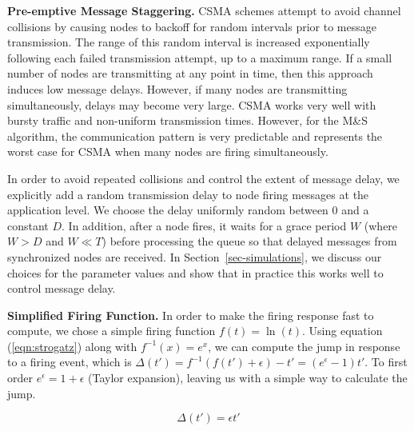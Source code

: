 {%




{\bf Pre-emptive Message Staggering.} CSMA schemes attempt to avoid
channel collisions by causing nodes to backoff for random intervals
prior to message transmission. The range of this random interval is
increased exponentially following each failed transmission attempt, up
to a maximum range.  If a small number of nodes are transmitting at
any point in time, then this approach induces low message delays.
However, if many nodes are transmitting simultaneously, delays may
become very large. CSMA works very well with bursty traffic and
non-uniform transmission times.  However, for the M\&S algorithm, the
communication pattern is very predictable and represents the worst
case for CSMA when many nodes are firing simultaneously.

In order to avoid repeated collisions and control the extent of
message delay, we explicitly add a random transmission delay to node
firing messages at the application level. We choose the delay
uniformly random between 0 and a constant $D$. In addition, after a
node fires, it waits for a grace period $W$ (where $W>D$ and $W \ll T$)
before processing the queue so that delayed messages from synchronized
nodes are received. In Section~\ref{sec-simulations}, we discuss our
choices for the parameter values and show that in practice this works
well to control message delay.

{\bf Simplified Firing Function.} In order to make the firing response
fast to compute, we chose a simple firing function $f(t) =
\ln(t)$. Using equation (\ref{eqn:strogatz}) along with
$f^{-1}(x)=e^x$, we can compute the jump in response to a firing
event, which is
$\Delta(t')=f^{-1}(f(t')+\epsilon)-t'=(e^{\epsilon}-1)t'$. To first
order $e^\epsilon = 1 + \epsilon$ (Taylor expansion), leaving us with
 a simple way to calculate the jump.

\begin{equation}\label{eqn:delta}
\Delta(t') = \epsilon t'
\end{equation}


}

